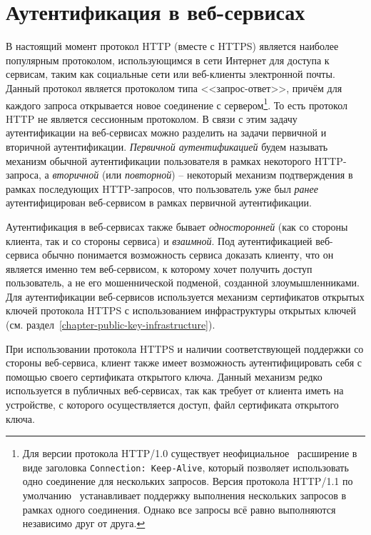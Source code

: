 \section{Аутентификация в веб-сервисах}

В настоящий момент протокол HTTP (вместе с HTTPS) является наиболее популярным протоколом, использующимся в сети Интернет для доступа к сервисам, таким как социальные сети или веб-клиенты электронной почты. Данный протокол является протоколом типа <<запрос-ответ>>, причём для каждого запроса открывается новое соединение с сервером\footnote{Для версии протокола HTTP/1.0 существует неофициальное~\cite[p.~17]{Totty:2002} расширение в виде заголовка \texttt{Connection: Keep-Alive}, который позволяет использовать одно соединение для нескольких запросов. Версия протокола HTTP/1.1 по умолчанию~\cite[6.3.~Persistence]{rfc7230} устанавливает поддержку выполнения нескольких запросов в рамках одного соединения. Однако все запросы всё равно выполняются независимо друг от друга.}. То есть протокол HTTP не является сессионным протоколом. В связи с этим задачу аутентификации на веб-сервисах можно разделить на задачи первичной и вторичной аутентификации. \emph{Первичной аутентификацией} будем называть механизм обычной аутентификации пользователя в рамках некоторого HTTP-запроса, а \emph{вторичной} (или \emph{повторной}) -- некоторый механизм подтверждения в рамках последующих HTTP-запросов, что пользователь уже был \emph{ранее} аутентифицирован веб-сервисом в рамках первичной аутентификации.

Аутентификация в веб-сервисах также бывает \emph{односторонней} (как со стороны клиента, так и со стороны сервиса) и \emph{взаимной}. Под аутентификацией веб-сервиса обычно понимается возможность сервиса доказать клиенту, что он является именно тем веб-сервисом, к которому хочет получить доступ пользователь, а не его мошеннической подменой, созданной злоумышленниками. Для аутентификации веб-сервисов используется механизм сертификатов открытых ключей протокола HTTPS с использованием инфраструктуры открытых ключей (см. раздел~\ref{chapter-public-key-infrastructure}).

При использовании протокола HTTPS и наличии соответствующей поддержки со стороны веб-сервиса, клиент также имеет возможность аутентифицировать себя с помощью своего сертификата открытого ключа. Данный механизм редко используется в публичных веб-сервисах, так как требует от клиента иметь на устройстве, с которого осуществляется доступ, файл сертификата открытого ключа.

